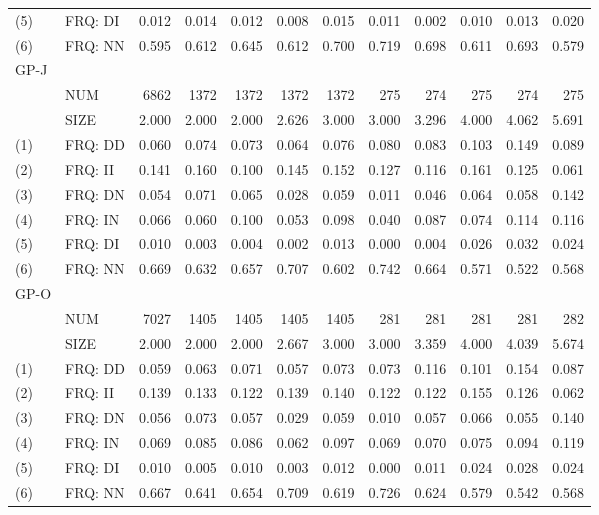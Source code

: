 \begin{table}[H]
\begin{tabular}{llrrrrrrrrrr}
		(5)  & FRQ: DI & 0.012 & 0.014 & 0.012 & 0.008 &  0.015 &  0.011 &  0.002 &  0.010 &  0.013 &  0.020 \\
		(6)  & FRQ: NN & 0.595 & 0.612 & 0.645 & 0.612 &  0.700 &  0.719 &  0.698 &  0.611 &  0.693 &  0.579 \\ \hline
		GP-J &         &       &       &       &       &        &        &        &        &        &        \\
		& NUM     &  6862 &  1372 &  1372 &  1372 &   1372 &    275 &    274 &    275 &    274 &    275 \\
		& SIZE    & 2.000 & 2.000 & 2.000 & 2.626 &  3.000 &  3.000 &  3.296 &  4.000 &  4.062 &  5.691 \\
		(1)  & FRQ: DD & 0.060 & 0.074 & 0.073 & 0.064 &  0.076 &  0.080 &  0.083 &  0.103 &  0.149 &  0.089 \\
		(2)  & FRQ: II & 0.141 & 0.160 & 0.100 & 0.145 &  0.152 &  0.127 &  0.116 &  0.161 &  0.125 &  0.061 \\
		(3)  & FRQ: DN & 0.054 & 0.071 & 0.065 & 0.028 &  0.059 &  0.011 &  0.046 &  0.064 &  0.058 &  0.142 \\
		(4)  & FRQ: IN & 0.066 & 0.060 & 0.100 & 0.053 &  0.098 &  0.040 &  0.087 &  0.074 &  0.114 &  0.116 \\
		(5)  & FRQ: DI & 0.010 & 0.003 & 0.004 & 0.002 &  0.013 &  0.000 &  0.004 &  0.026 &  0.032 &  0.024 \\
		(6)  & FRQ: NN & 0.669 & 0.632 & 0.657 & 0.707 &  0.602 &  0.742 &  0.664 &  0.571 &  0.522 &  0.568 \\ \hline
		GP-O &         &       &       &       &       &        &        &        &        &        &        \\
		& NUM     &  7027 &  1405 &  1405 &  1405 &   1405 &    281 &    281 &    281 &    281 &    282 \\
		& SIZE    & 2.000 & 2.000 & 2.000 & 2.667 &  3.000 &  3.000 &  3.359 &  4.000 &  4.039 &  5.674 \\
		(1)  & FRQ: DD & 0.059 & 0.063 & 0.071 & 0.057 &  0.073 &  0.073 &  0.116 &  0.101 &  0.154 &  0.087 \\
		(2)  & FRQ: II & 0.139 & 0.133 & 0.122 & 0.139 &  0.140 &  0.122 &  0.122 &  0.155 &  0.126 &  0.062 \\
		(3)  & FRQ: DN & 0.056 & 0.073 & 0.057 & 0.029 &  0.059 &  0.010 &  0.057 &  0.066 &  0.055 &  0.140 \\
		(4)  & FRQ: IN & 0.069 & 0.085 & 0.086 & 0.062 &  0.097 &  0.069 &  0.070 &  0.075 &  0.094 &  0.119 \\
		(5)  & FRQ: DI & 0.010 & 0.005 & 0.010 & 0.003 &  0.012 &  0.000 &  0.011 &  0.024 &  0.028 &  0.024 \\
		(6)  & FRQ: NN & 0.667 & 0.641 & 0.654 & 0.709 &  0.619 &  0.726 &  0.624 &  0.579 &  0.542 &  0.568 \\ \hline\hline
	\end{tabular}
\end{table}


